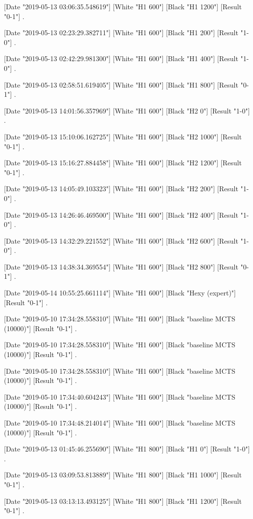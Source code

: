 {[Date "2019-05-13 03:06:35.548619"]
[White "H1 600"]
[Black "H1 1200"]
[Result "0-1"]
.

[Date "2019-05-13 02:23:29.382711"]
[White "H1 600"]
[Black "H1 200"]
[Result "1-0"]
.

[Date "2019-05-13 02:42:29.981300"]
[White "H1 600"]
[Black "H1 400"]
[Result "1-0"]
.

[Date "2019-05-13 02:58:51.619405"]
[White "H1 600"]
[Black "H1 800"]
[Result "0-1"]
.

[Date "2019-05-13 14:01:56.357969"]
[White "H1 600"]
[Black "H2 0"]
[Result "1-0"]
.

[Date "2019-05-13 15:10:06.162725"]
[White "H1 600"]
[Black "H2 1000"]
[Result "0-1"]
.

[Date "2019-05-13 15:16:27.884458"]
[White "H1 600"]
[Black "H2 1200"]
[Result "0-1"]
.

[Date "2019-05-13 14:05:49.103323"]
[White "H1 600"]
[Black "H2 200"]
[Result "1-0"]
.

[Date "2019-05-13 14:26:46.469500"]
[White "H1 600"]
[Black "H2 400"]
[Result "1-0"]
.

[Date "2019-05-13 14:32:29.221552"]
[White "H1 600"]
[Black "H2 600"]
[Result "1-0"]
.

[Date "2019-05-13 14:38:34.369554"]
[White "H1 600"]
[Black "H2 800"]
[Result "0-1"]
.

[Date "2019-05-14 10:55:25.661114"]
[White "H1 600"]
[Black "Hexy (expert)"]
[Result "0-1"]
.

[Date "2019-05-10 17:34:28.558310"]
[White "H1 600"]
[Black "baseline MCTS (10000)"]
[Result "0-1"]
.

[Date "2019-05-10 17:34:28.558310"]
[White "H1 600"]
[Black "baseline MCTS (10000)"]
[Result "0-1"]
.

[Date "2019-05-10 17:34:28.558310"]
[White "H1 600"]
[Black "baseline MCTS (10000)"]
[Result "0-1"]
.

[Date "2019-05-10 17:34:40.604243"]
[White "H1 600"]
[Black "baseline MCTS (10000)"]
[Result "0-1"]
.

[Date "2019-05-10 17:34:48.214014"]
[White "H1 600"]
[Black "baseline MCTS (10000)"]
[Result "0-1"]
.

[Date "2019-05-13 01:45:46.255690"]
[White "H1 800"]
[Black "H1 0"]
[Result "1-0"]
.

[Date "2019-05-13 03:09:53.813889"]
[White "H1 800"]
[Black "H1 1000"]
[Result "0-1"]
.

[Date "2019-05-13 03:13:13.493125"]
[White "H1 800"]
[Black "H1 1200"]
[Result "0-1"]
.

}
